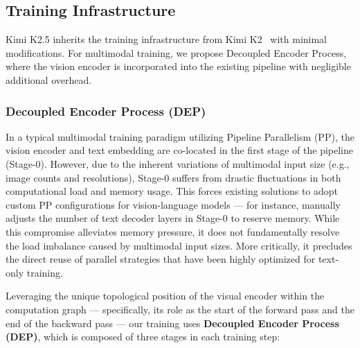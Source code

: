 

 




\subsection{Training Infrastructure}

Kimi K2.5 inherits the training infrastructure from Kimi K2~\citep{team2025kimik2} with minimal modifications.  For multimodal training, we propose Decoupled Encoder Process, where the vision encoder is incorporated into the existing pipeline with negligible additional overhead.

\subsubsection{Decoupled Encoder Process (DEP)}

In a typical multimodal training paradigm utilizing Pipeline Parallelism (PP), the vision encoder and text embedding are co-located in the first stage of the pipeline (Stage-0). However, due to the inherent variations of multimodal input size (e.g., image counts and resolutions), Stage-0 suffers from drastic fluctuations in both computational load and memory usage. This forces existing solutions to adopt custom PP configurations for vision-language models --- for instance, \cite{team2025kimivl} manually adjusts the number of text decoder layers in Stage-0 to reserve memory. While this compromise alleviates memory pressure, it does not fundamentally resolve the load imbalance caused by multimodal input sizes. More critically, it precludes the direct reuse of parallel strategies that have been highly optimized for text-only training.

Leveraging the unique topological position of the visual encoder within the computation graph --- specifically, its role as the start of the forward pass and the end of the backward pass --- our training uses \textbf{Decoupled Encoder Process (DEP)}, which is composed of three stages in each training step:

